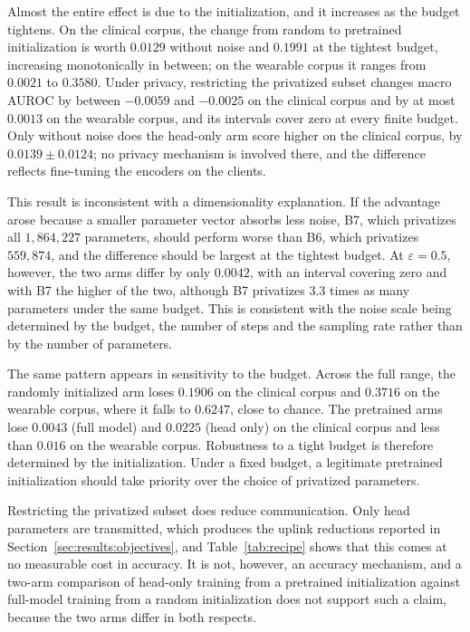 Almost the entire effect is due to the initialization, and it increases as the
budget tightens. On the clinical corpus, the change from random to pretrained
initialization is worth $0.0129$ without noise and $0.1991$ at the tightest
budget, increasing monotonically in between; on the wearable corpus it ranges
from $0.0021$ to $0.3580$. Under privacy, restricting the privatized subset
changes macro AUROC by between $-0.0059$ and $-0.0025$ on the clinical corpus
and by at most $0.0013$ on the wearable corpus, and its intervals cover zero at
every finite budget. Only without noise does the head-only arm score higher on
the clinical corpus, by $0.0139 \pm 0.0124$; no privacy mechanism is involved
there, and the difference reflects fine-tuning the encoders on the clients.

This result is inconsistent with a dimensionality explanation. If the advantage arose
because a smaller parameter vector absorbs less noise, B7, which privatizes all
$1{,}864{,}227$ parameters, should perform worse than B6, which privatizes
$559{,}874$, and the difference should be largest at the tightest budget. At
$\varepsilon = 0.5$, however, the two arms differ by only $0.0042$, with an
interval covering zero and with B7 the higher of the two, although B7
privatizes $3.3$ times as many parameters under the same budget. This is consistent with the noise scale being determined
by the budget, the number of steps and the sampling rate rather than by the
number of parameters.

The same pattern appears in sensitivity to the budget. Across the full range,
the randomly initialized arm loses $0.1906$ on the clinical corpus and $0.3716$
on the wearable corpus, where it falls to $0.6247$, close to chance. The
pretrained arms lose $0.0043$ (full model) and $0.0225$ (head only) on the
clinical corpus and less than $0.016$ on the wearable corpus. Robustness to
a tight budget is therefore determined by the initialization. Under a fixed
budget, a legitimate pretrained initialization should take priority over the
choice of privatized parameters.

Restricting the privatized subset does reduce communication. Only head
parameters are transmitted, which produces the uplink reductions reported in
Section~\ref{sec:results:objectives}, and Table~\ref{tab:recipe} shows that this
comes at no measurable cost in accuracy. It is not, however, an accuracy
mechanism, and a two-arm comparison of head-only training from a pretrained
initialization against full-model training from a random initialization does
not support such a claim, because the two arms differ in both respects.


